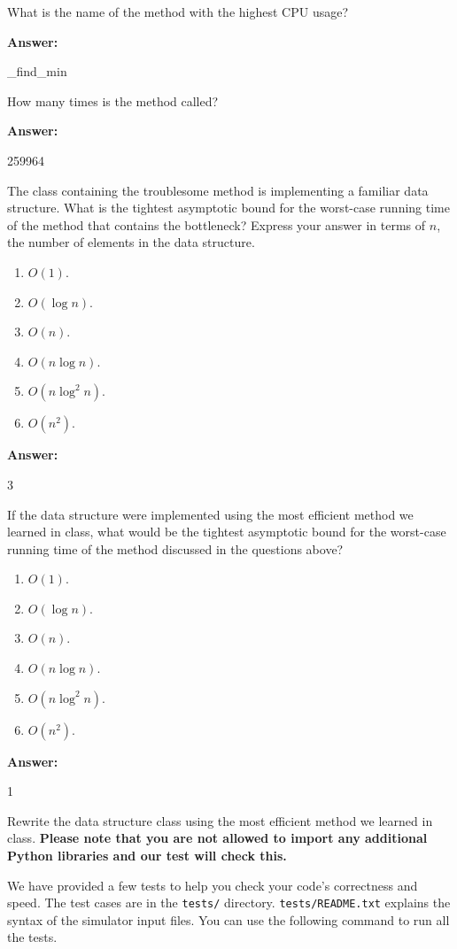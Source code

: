 \documentclass[12pt,twoside]{article}
\newcommand{\answer}{
	\par\medskip
	\textbf{Answer:}
}
\newcommand{\answerIIa}{ \answer
	\_find\_min
}
\newcommand{\answerIIb}{ \answer
	259964
}
\newcommand{\answerIIc}{ \answer
	3
}
\newcommand{\answerIId}{ \answer
	1
}
\begin{document}
\begin{problems}
\begin{problemparts}
		What is the name of the method with the highest CPU usage?
		\answerIIa


		\problempart {} How many times is the method called?
		\answerIIb

		\problempart {} The class containing the troublesome method is
		implementing a familiar data structure. What is the tightest asymptotic bound
		for the worst-case running time of the method that contains the bottleneck?
		Express your answer in terms of $n$, the number of elements in the data
		structure.
		\begin{enumerate}
			\item $O(1)$.
			\item $O(\log n)$.
			\item $O(n)$.
			\item $O(n \log n)$.
			\item $O(n \log^2 n)$.
			\item $O(n^2)$.
		\end{enumerate}
		\answerIIc

		\problempart {} If the data structure were implemented using the most
		efficient method we learned in class, what would be the tightest asymptotic
		bound for the worst-case running time of the method discussed in the questions
		above?
		\begin{enumerate}
			\item $O(1)$.
			\item $O(\log n)$.
			\item $O(n)$.
			\item $O(n \log n)$.
			\item $O(n \log^2 n)$.
			\item $O(n^2)$.
		\end{enumerate}
		\answerIId

		\problempart {} Rewrite the data structure class using the most
		efficient method we learned in class. \textbf{Please note that you are not
			allowed to import any additional Python libraries and our test will check this.}

		We have provided a few tests to help you check your code's correctness and
		speed. The test cases are in the \texttt{tests/} directory.
		\texttt{tests/README.txt} explains the syntax of the simulator input files. You
		can use the following command to run all the tests.


\end{problemparts}
\end{problems}
\end{document}
